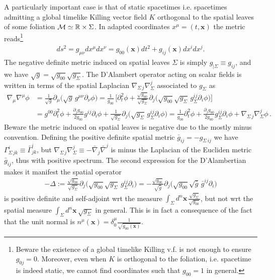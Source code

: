 \documentclass[../QFT_main.tex]{subfiles}
\begin{document}
\begin{mytheorem}
A particularly important case is that of static spacetimes i.e. spacetimes admitting a global timelike Killing vector field $K$ orthogonal to the spatial leaves of some foliation $\mathcal{M}\simeq \mathbb{R}\times \Sigma$.
In adapted coordinates $x^\mu=(t,\mathbf{x})$ the metric reads\footnote{Beware the existence of a global timelike Killing v.f. is not enough to ensure $g_{0j}=0$. Moreover, even when $K$ is orthogonal to the foliation, i.e. spacetime is indeed static, we cannot find coordinates such that $g_{00}=1$ in general.}
\begin{align}
    ds^2 = g_{\mu\nu} dx^\mu dx^\nu = g_{00}(\mathbf{x}) dt^2 + g_{ij}(\mathbf{x}) dx^i dx^j.
\end{align}
The negative definite metric induced on spatial leaves $\Sigma$ is simply $g_{|\Sigma}\equiv g_{ij}$, and we have $\sqrt{g}=\sqrt{g_{00}}\sqrt{g_\Sigma}$.
The D'Alambert operator acting on scalar fields is written in terms of the spatial Laplacian ${\nabla}_{\!\!\Sigma\,j}{\nabla}^j_{\!\!\Sigma}$ associated to $g_\Sigma$ as
{\small\begin{align}
  \nabla_\mu\nabla^\mu \phi &=\tfrac{1}{\sqrt{g}}\partial_\mu\Big(\sqrt{g}\,g^{\mu\nu}\partial_\nu\phi\Big)= \frac{1}{g_{00}}\,\Big[\partial_t^2\phi+ \tfrac{\sqrt{g_{00}}}{\sqrt{g_\Sigma}}\partial_j\Big(\sqrt{g_{00}}\sqrt{g_\Sigma}\,g_\Sigma^{ij}\partial_i\phi\Big)\Big]\\
  &= g^{00} \partial_t^2 \phi +\tfrac{\partial_jg_{00}}{2g_{00}} g^{ij} \partial_i \phi +\tfrac{1}{\sqrt{g_\Sigma}}\partial_j\Big(\sqrt{g_\Sigma}\, g_\Sigma^{ij}\partial_i \phi\Big)=\tfrac{1}{g_{00}} \partial_t^2 \phi + \tfrac{\partial_jg_{00}}{2g_{00}} g^{ij}_\Sigma \partial_i \phi +{\nabla}_{\!\!\Sigma\,j}{\nabla}^j_{\!\!\Sigma}\phi\,.
\end{align}}
Beware the metric induced on spatial leaves is negative due to the mostly minus convention.
Defining the positive definite spatial metric $\bar{g}_{ij}=-g_{\Sigma\,ij}$ we have $\Gamma^i_{\!\!\Sigma\, jk}\equiv \bar{\Gamma}_{jk}^i$, but ${\nabla}_{\!\!\Sigma\,j}{\nabla}^j_{\!\!\Sigma}\equiv - \bar{\nabla}_j \bar{\nabla}^j$ is minus the Laplacian of the Eucliden metric $\bar{g}_{ij}$, thus with positive spectrum.
The second expression for the D'Alambertian makes it manifest the spatial operator
{\small\begin{align}
    -\Delta:= \tfrac{\sqrt{g_{00}}}{\sqrt{g_\Sigma}}
    \partial_j\!\Big(\sqrt{g_{00}}\sqrt{g_\Sigma}\,g_\Sigma^{ij}\partial_i\Big)=-\tfrac{\sqrt{g_{00}}}{\sqrt{\bar{g}}}
    \partial_j\!\Big(\sqrt{g_{00}}\sqrt{\bar{g}}\,\bar{g}^{ij}\partial_i\Big)
\end{align}}
is positive definite and self-adjoint wrt the measure $\int_\Sigma\!\!\! d^n\mathbf{x}\, \tfrac{\sqrt{g_{\Sigma}}}{\sqrt{g_{00}}}$, but not wrt the spatial measure $\int_\Sigma\!\!\! d^n\mathbf{x}\,\sqrt{g_{\Sigma}}$ in general.
This is in fact a consequence of the fact that the unit normal is $n^\mu(\mathbf{x})=\delta^\mu_0 \tfrac{1}{\sqrt{g_{00}(\mathbf{x})}}$.


\end{mytheorem}
\end{document}
